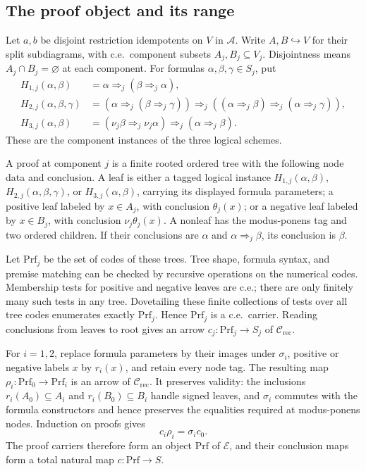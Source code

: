 \documentclass[11pt]{article}
\begin{document}
\subsection{The proof object and its range}

Let $a,b$ be disjoint restriction idempotents on $V$ in $\mathcal A$.
Write $A,B\hookrightarrow V$ for their split subdiagrams, with
c.e.\ component subsets $A_j,B_j\subseteq V_j$. Disjointness
means $A_j\cap B_j=\varnothing$ at each component.
For formulas $\alpha,\beta,\gamma\in S_j$, put
\begin{align*}
 H_{1,j}(\alpha,\beta)
   &=\alpha\Rightarrow_j(\beta\Rightarrow_j\alpha),\\
 H_{2,j}(\alpha,\beta,\gamma)
   &=(\alpha\Rightarrow_j(\beta\Rightarrow_j\gamma))
     \Rightarrow_j((\alpha\Rightarrow_j\beta)
                          \Rightarrow_j(\alpha\Rightarrow_j\gamma)),\\
 H_{3,j}(\alpha,\beta)
   &=(\nu_j\beta\Rightarrow_j\nu_j\alpha)
                          \Rightarrow_j(\alpha\Rightarrow_j\beta).
\end{align*}
These are the component instances of the three logical schemes.

A proof at component $j$ is a finite rooted ordered tree with
the following node data and conclusion. A leaf is either a
tagged logical instance $H_{1,j}(\alpha,\beta)$,
$H_{2,j}(\alpha,\beta,\gamma)$, or
$H_{3,j}(\alpha,\beta)$, carrying its displayed formula
parameters; a positive leaf labeled by $x\in A_j$, with
conclusion $\theta_j(x)$; or a negative leaf labeled by
$x\in B_j$, with conclusion $\nu_j\theta_j(x)$.
A nonleaf has the modus-ponens tag and two ordered children.
If their conclusions are $\alpha$ and
$\alpha\Rightarrow_j\beta$, its conclusion is $\beta$.

Let $\mathrm{Prf}_j$ be the set of codes of these trees.
Tree shape, formula syntax, and premise matching can be checked
by recursive operations on the numerical codes. Membership tests
for positive and negative leaves are c.e.; there are only finitely
many such tests in any tree. Dovetailing these finite collections
of tests over all tree codes enumerates exactly $\mathrm{Prf}_j$.
Hence $\mathrm{Prf}_j$ is a c.e.\ carrier.
Reading conclusions from leaves to root gives an arrow
$c_j:\mathrm{Prf}_j\to S_j$ of $\mathcal C_{\mathrm{rec}}$.

For $i=1,2$, replace formula parameters by their images under
$\sigma_i$, positive or negative labels $x$ by $r_i(x)$, and
retain every node tag. The resulting map
$\rho_i:\mathrm{Prf}_0\to\mathrm{Prf}_i$ is an arrow of
$\mathcal C_{\mathrm{rec}}$.
It preserves validity: the inclusions $r_i(A_0)\subseteq A_i$
and $r_i(B_0)\subseteq B_i$ handle signed leaves, and
$\sigma_i$ commutes with the formula constructors and hence
preserves the equalities required at modus-ponens nodes.
Induction on proofs gives
\[
 c_i\rho_i=\sigma_i c_0.
\]
The proof carriers therefore form an object $\mathrm{Prf}$ of
$\mathcal E$, and their conclusion maps form a total natural map
$c:\mathrm{Prf}\to S$.
\end{document}

